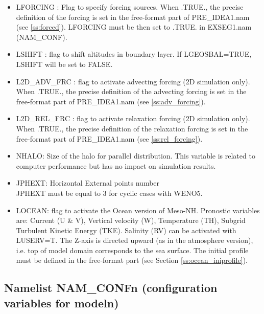 \begin{itemize}
\item LFORCING  : Flag to 
specify forcing sources.
When .TRUE., the precise definition of the forcing is set in the free-format 
part of PRE\_IDEA1.nam (see \ref{ss:forced}). LFORCING must be then set to .TRUE. in EXSEG1.nam (NAM\_CONF).

\item LSHIFT  : flag to shift altitudes in boundary layer. If LGEOSBAL=TRUE, LSHIFT will be set to FALSE.

\item L2D\_ADV\_FRC  : flag to activate advecting forcing (2D simulation only). When .TRUE., the precise definition of the advecting forcing is set in the free-format 
part of PRE\_IDEA1.nam (see \ref{ss:adv_forcing}).

\item L2D\_REL\_FRC  : flag to activate relaxation forcing (2D simulation only). When .TRUE., the precise definition of the relaxation forcing is set in the free-format 
part of PRE\_IDEA1.nam (see \ref{ss:rel_forcing}).

 \item
NHALO: Size of the halo for parallel distribution.
This variable is related to computer performance but has no
impact on simulation results.\\

\item
JPHEXT:  Horizontal External points number\\
JPHEXT must be equal to 3 for cyclic cases with WENO5.

\item
LOCEAN: flag to activate the Ocean version of Meso-NH. Pronostic variables are: Current (U \& V), Vertical velocity (W), Temperature (TH), Subgrid Turbulent Kinetic Energy (TKE). Salinity (RV) can be activated with LUSERV=T. The Z-axis is directed upward (as in the atmosphere version), i.e. top of model domain corresponds to the sea surface. The initial profile must be defined in the free-format part (see Section \ref{ss:ocean_iniprofile}).

\end{itemize}


\subsection{Namelist NAM\_CONFn (configuration variables for
modeln)}

